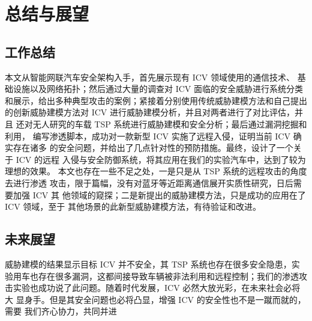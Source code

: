 \chapter{总结与展望}
\label{ch6}

\section{工作总结}
本文从智能网联汽车安全架构入手，首先展示现有 ICV 领域使用的通信技术、
基础设施以及网络拓扑；然后通过大量的调查对 ICV 面临的安全威胁进行系统分类
和展示，给出多种典型攻击的案例；紧接着分别使用传统威胁建模方法和自己提出
的创新威胁建模方法对 ICV 进行威胁建模分析，并且对两者进行了对比评估，并且
还对无人研究的车载 TSP 系统进行威胁建模和安全分析；最后通过漏洞挖掘和利用，
编写渗透脚本，成功对一款新型 ICV 实施了远程入侵，证明当前 ICV 确实存在诸多
的安全问题，并给出了几点针对性的预防措施。最终，设计了一个关于 ICV 的远程
入侵与安全防御系统，将其应用在我们的实验汽车中，达到了较为理想的效果。
本文也存在一些不足之处，一是只是从 TSP 系统的远程攻击的角度去进行渗透
攻击，限于篇幅，没有对蓝牙等近距离通信展开实质性研究，日后需要加强 ICV 其
他领域的窥探；二是新提出的威胁建模方法，只是成功的应用在了 ICV 领域，至于
其他场景的此新型威胁建模方法，有待验证和改进。

\section{未来展望}

威胁建模的结果显示目标 ICV 并不安全，其 TSP 系统也存在很多安全隐患，实
验用车也存在很多漏洞，这都间接导致车辆被非法利用和远程控制；我们的渗透攻
击实验也成功说了此问题。随着时代发展，ICV 必然大放光彩，在未来社会必将大
显身手。但是其安全问题也必将凸显，增强 ICV 的安全性也不是一蹴而就的，需要
我们齐心协力，共同并进